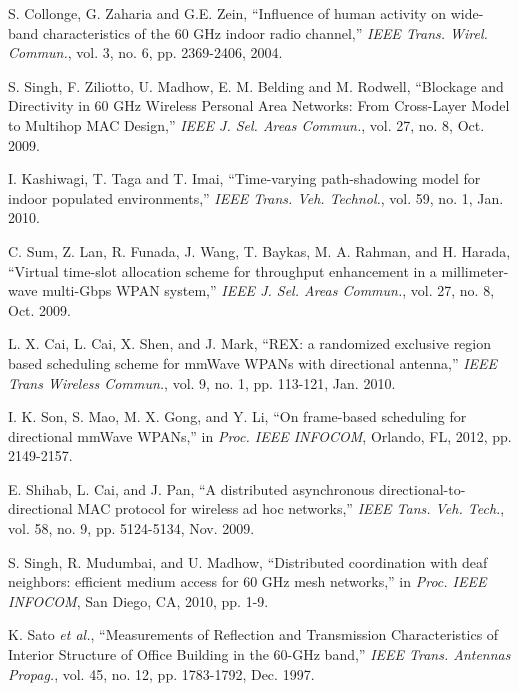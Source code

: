 \documentclass[10pt, conference, letterpaper]{IEEEtran}
\begin{document}
\begin{thebibliography}{50}
S. Collonge, G. Zaharia and G.E. Zein, ``Influence of human activity on wide-band characteristics of the 60 GHz indoor radio channel,'' \emph{IEEE Trans. Wirel. Commun.}, vol. 3,  no. 6, pp. 2369-2406, 2004.

S. Singh, F. Ziliotto, U. Madhow, E. M. Belding and M. Rodwell, ``Blockage and Directivity in 60 GHz Wireless Personal Area Networks: From Cross-Layer Model to Multihop MAC Design,'' \emph{IEEE J. Sel. Areas Commun.}, vol. 27, no. 8, Oct. 2009.

I. Kashiwagi, T. Taga and T. Imai, ``Time-varying path-shadowing model for indoor populated environments,'' \emph{IEEE Trans. Veh. Technol.}, vol. 59, no. 1, Jan. 2010.

C. Sum, Z. Lan, R. Funada, J. Wang, T. Baykas, M. A. Rahman, and H. Harada, ``Virtual time-slot allocation scheme for throughput enhancement in a millimeter-wave multi-Gbps WPAN system,'' \emph{IEEE J. Sel. Areas Commun.}, vol. 27, no. 8, Oct. 2009.

L. X. Cai, L. Cai, X. Shen, and J. Mark, ``REX: a randomized exclusive region based scheduling scheme for mmWave WPANs with directional antenna,'' \emph{IEEE Trans Wireless Commun.}, vol. 9, no. 1, pp. 113-121, Jan. 2010. 

I. K. Son, S. Mao, M. X. Gong, and Y. Li, ``On frame-based scheduling for directional mmWave WPANs,'' in \emph{Proc. IEEE INFOCOM}, Orlando, FL, 2012, pp. 2149-2157.

E. Shihab, L. Cai, and J. Pan, ``A distributed asynchronous directional-to-directional MAC protocol for wireless ad hoc networks,'' \emph{IEEE Tans. Veh. Tech.}, vol. 58, no. 9, pp. 5124-5134, Nov. 2009. 

S. Singh, R. Mudumbai, and U. Madhow, ``Distributed coordination with deaf neighbors: efficient medium access for 60 GHz mesh networks,'' in \emph{Proc. IEEE INFOCOM}, San Diego, CA, 2010, pp. 1-9.


K. Sato \emph{et al.}, ``Measurements of Reflection and Transmission Characteristics of Interior Structure of Office Building in the 60-GHz band,'' \emph{IEEE Trans. Antennas Propag.}, vol. 45, no. 12, pp. 1783-1792, Dec. 1997.


\end{thebibliography}
\end{document}
